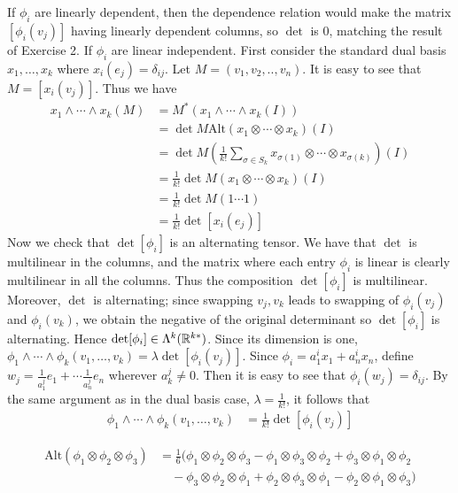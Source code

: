 \documentclass[12pt]{article}
\begin{document}
\begin{problem}[4.2.3]
	If $ \phi_i $ are linearly dependent, then the dependence relation would make the matrix $ [\phi_i(v_j)]$ having linearly dependent columns, so $ \det $ is 0, matching the result of Exercise 2. If $ \phi_i$ are linear independent. First consider the standard dual basis $ x_1,\ldots,x_k$ where $ x_i(e_j) = \delta_{ij}$. Let $ M = (v_1,v_2,..,v_n)$. It is easy to see that $ M = [x_i(v_j)]$. Thus we have
	\begin{align*}
		x_1 \wedge \cdots \wedge x_k(M) &= M^* (x_1 \wedge \cdots \wedge x_k(I)) \\
		&= \det M \text{Alt} (x_1 \otimes \cdots \otimes  x_k)(I) \\
		&= \det M \left( \frac{1}{k!} \sum_{ \sigma \in S_k} x_{ \sigma(1)} \otimes \cdots \otimes x_{ \sigma(k)} \right)(I)  \\
		&= \frac{1}{k!} \det M (x_1 \otimes \cdots \otimes x_k)(I) \\
		&= \frac{1}{k!} \det M (1\cdots 1) \\
		&= \frac{1}{k!} \det [x_i(e_j)] 
	\end{align*}
	Now we check that $ \det [\phi_i]$ is an alternating tensor. We have that $ \det $ is multilinear in the columns, and the matrix where each entry $ \phi_i$ is linear is clearly multilinear in all the columns. Thus the composition $ \det [\phi_i]$ is multilinear. Moreover, $ \det $ is alternating; since swapping $ v_j,v_k$ leads to swapping of $ \phi_i(v_j)$ and $ \phi_i(v_k)$, we obtain the negative of the original determinant so $ \det [\phi_i]$ is alternating. Hence  $ \det [\phi_i] \in \Lambda^{k}(\mathbb{R}^{k*})$. Since its dimension is one, $ \phi_1 \wedge \cdots \wedge \phi_k (v_1,\ldots,v_k) = \lambda \det [\phi_i(v_j)]$. Since $ \phi_i= a_1^{i} x_1 + a_n^{i} x_n$, define $ w_j = \frac{1}{a_1^{j}} e_1 + \cdots \frac{1}{a_n^{j}} e_n$ wherever $ a_k^{j} \neq 0$. Then it is easy to see that $ \phi_i (w_j) = \delta_{ij}$. By the same argument as in the dual basis case, $ \lambda = \frac{1}{k!}$, it follows that 
	\begin{align*}
		\phi_1 \wedge \cdots \wedge \phi_k(v_1,\ldots,v_k) &= \frac{1}{k!} \det [\phi_i(v_j)]
	\end{align*}
\end{problem}

\begin{problem}[4.2.5]
\begin{align*}
	\text{Alt}(\phi_1 \otimes \phi_2 \otimes \phi_3) &= \frac{1}{6} (\phi_1 \otimes \phi_2 \otimes \phi_3 - \phi_1 \otimes \phi_3 \otimes \phi_2 + \phi_3 \otimes \phi_1 \otimes \phi_2 \\
	& \quad - \phi_3 \otimes \phi_2 \otimes \phi_1 +\phi_2 \otimes \phi_3 \otimes \phi_1 - \phi_2 \otimes \phi_1 \otimes \phi_3) \\ 
\end{align*}
\end{problem}
\end{document}
